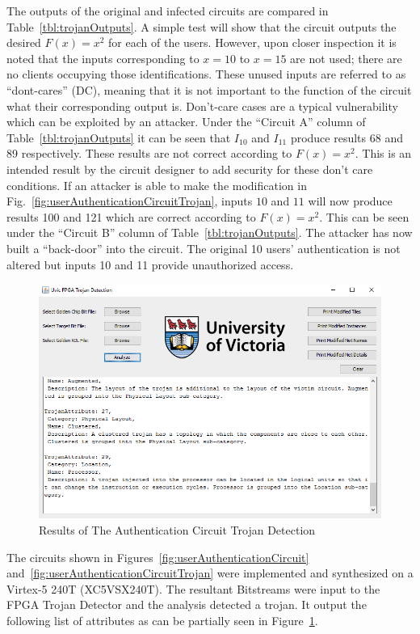 \documentclass[journal, hidelinks]{IEEEtran}
\begin{document}
The outputs of the original and infected circuits are compared in Table~\ref{tbl:trojanOutputs}.
A simple test will show that the circuit outputs the desired $F(x) = x^2$ for each of the users.
However, upon closer inspection it is noted that the inputs corresponding to $x = 10$ to $x = 15$ are not used; there are no clients occupying those identifications.
These unused inputs are referred to as ``dont-cares'' (DC), meaning that it is not important to the function of the circuit what their corresponding output is.
Don't-care cases are a typical vulnerability which can be exploited by an attacker.
Under the ``Circuit A'' column of Table~\ref{tbl:trojanOutputs} it can be seen that $I_{10}$ and $I_{11}$ produce results 68 and 89 respectively.
These results are not correct according to $F(x) = x^2$.
This is an intended result by the circuit designer to add security for these don't care conditions.
If an attacker is able to make the modification in Fig.~\ref{fig:userAuthenticationCircuitTrojan}, inputs $10$ and $11$ will now produce results 100 and 121 which are correct according to $F(x) = x^2$.
This can be seen under the ``Circuit B'' column of Table~\ref{tbl:trojanOutputs}.
The attacker has now built a ``back-door'' into the circuit.
The original 10 users' authentication is not altered but inputs 10 and 11 provide unauthorized access.
\begin{figure}[b]
	\centering
	\includegraphics[width=0.7\linewidth]{Figures/backDoorResult}
	\caption[Results of The Authentication Circuit Trojan Detection]{Results of The Authentication Circuit Trojan Detection}
	\label{fig:backDoorResult}
\end{figure}

The circuits shown in Figures~\ref{fig:userAuthenticationCircuit} and~\ref{fig:userAuthenticationCircuitTrojan} were implemented and synthesized on a Virtex-5 240T  (XC5VSX240T).
The resultant Bitstreams were input to the FPGA Trojan Detector and the analysis detected a trojan.
It output the following list of attributes as can be partially seen in Figure~\ref{fig:backDoorResult}.
\end{document}
